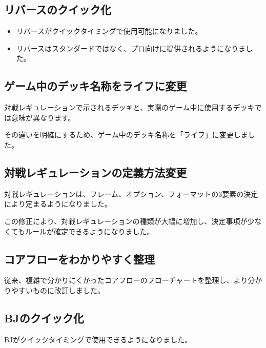\documentclass[letterpaper,10pt,dvipdfmx]{sphinxmanual}
\begin{document}
\subsection{リバースのクイック化}
\label{\detokenize{revision-history/7th:id2}}\begin{itemize}
\item {} 
\sphinxAtStartPar
リバースがクイックタイミングで使用可能になりました。

\item {} 
\sphinxAtStartPar
リバースはスタンダードではなく、プロ向けに提供されるようになりました。

\end{itemize}


\subsection{ゲーム中のデッキ名称をライフに変更}
\label{\detokenize{revision-history/7th:id3}}
\sphinxAtStartPar
対戦レギュレーションで示されるデッキと、実際のゲーム中に使用するデッキでは意味が異なります。

\sphinxAtStartPar
その違いを明確にするため、ゲーム中のデッキ名称を「ライフ」に変更しました。


\subsection{対戦レギュレーションの定義方法変更}
\label{\detokenize{revision-history/7th:id4}}
\sphinxAtStartPar
対戦レギュレーションは、フレーム、オプション、フォーマットの3要素の決定により定まるようになりました。

\sphinxAtStartPar
この修正により、対戦レギュレーションの種類が大幅に増加し、決定事項が少なくてもルールが確定できるようになりました。


\subsection{コアフローをわかりやすく整理}
\label{\detokenize{revision-history/7th:id5}}
\sphinxAtStartPar
従来、複雑で分かりにくかったコアフローのフローチャートを整理し、より分かりやすいものに改訂しました。


\subsection{BJのクイック化}
\label{\detokenize{revision-history/7th:bj}}
\sphinxAtStartPar
BJがクイックタイミングで使用できるようになりました。
\end{document}
